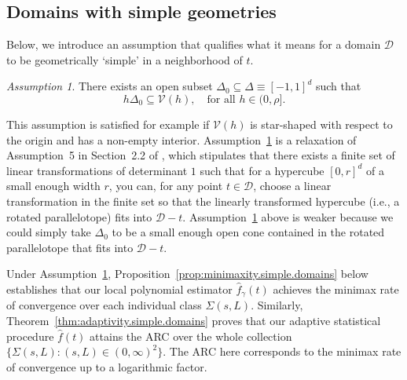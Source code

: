 \documentclass[bj,authoryear]{imsart}
\numberwithin{equation}{section}
\theoremstyle{plain}
\theoremstyle{remark}
\newtheorem{assumption}{Assumption}
\newcommand{\1}{\mathds{1}}
\newcommand{\domain}{\mathcal{D}}
\newcommand{\voisin}{\mathcal{V}}
\begin{document}
\subsection{Domains with simple geometries}\label{sec:simple.domain}

    Below, we introduce an assumption that qualifies what it means for a domain $\domain$ to be geometrically `simple' in a neighborhood of $t$.
    \begin{assumption}\label{ass:1}
        There exists an open subset $\Delta_0\subseteq \Delta \equiv [-1,1]^d$ such that
        \begin{equation*}
            h \Delta_0\subseteq \voisin(h), \quad \text{for all } h \in (0,\rho].
        \end{equation*}
    \end{assumption}
    This assumption is satisfied for example if $\voisin(h)$ is star-shaped with respect to the origin and has a non-empty interior. Assumption~\ref{ass:1} is a relaxation of Assumption~5 in Section~2.2 of \cite{Bertin_et_al2020}, which stipulates that there exists a finite set of linear transformations of determinant $1$ such that for a hypercube $[0,r]^d$ of a small enough width $r$, you can, for any point $t\in \domain$, choose a linear transformation in the finite set so that the linearly transformed hypercube (i.e., a rotated parallelotope) fits into $\domain - t$. Assumption~\ref{ass:1} above is weaker because we could simply take $\Delta_0$ to be a small enough open cone contained in the rotated parallelotope that fits into $\domain - t$.

    Under Assumption~\ref{ass:1}, Proposition~\ref{prop:minimaxity.simple.domains} below establishes that our local polynomial estimator $\hat{f}_{\gamma}(t)$ achieves the minimax rate of convergence over each individual class $\Sigma(s,L)$. Similarly, Theorem~\ref{thm:adaptivity.simple.domains} proves that our adaptive statistical procedure $\hat{f}(t)$ attains the ARC over the whole collection $\{\Sigma(s,L) : (s,L)\in (0,\infty)^2\}$. The ARC here corresponds to the minimax rate of convergence up to a logarithmic factor.
\end{document}

